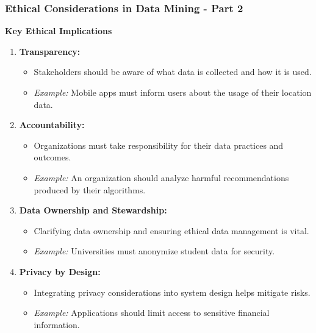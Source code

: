 \documentclass[aspectratio=169]{beamer}
\begin{document}
\begin{frame}[fragile]
    \frametitle{Ethical Considerations in Data Mining - Part 2}
    \textbf{Key Ethical Implications}
    \begin{enumerate}
        \item \textbf{Transparency:}
            \begin{itemize}
                \item Stakeholders should be aware of what data is collected and how it is used.
                \item \textit{Example:} Mobile apps must inform users about the usage of their location data.
            \end{itemize}
        \item \textbf{Accountability:}
            \begin{itemize}
                \item Organizations must take responsibility for their data practices and outcomes.
                \item \textit{Example:} An organization should analyze harmful recommendations produced by their algorithms.
            \end{itemize}
        \item \textbf{Data Ownership and Stewardship:}
            \begin{itemize}
                \item Clarifying data ownership and ensuring ethical data management is vital.
                \item \textit{Example:} Universities must anonymize student data for security.
            \end{itemize}
        \item \textbf{Privacy by Design:}
            \begin{itemize}
                \item Integrating privacy considerations into system design helps mitigate risks.
                \item \textit{Example:} Applications should limit access to sensitive financial information.
            \end{itemize}
    \end{enumerate}
\end{frame}
\end{document}
